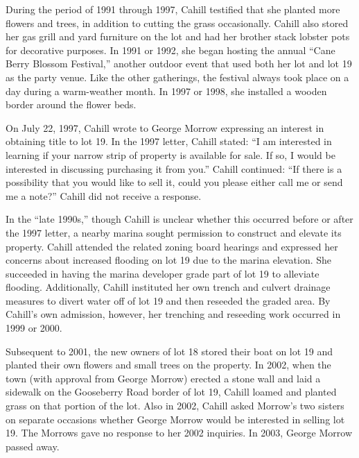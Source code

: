 During the period of 1991 through 1997, Cahill testified that she planted more
flowers and trees, in addition to cutting the grass occasionally. Cahill also
stored her gas grill and yard furniture on the lot and had her brother stack
lobster pots for decorative purposes. In 1991 or 1992, she began hosting the
annual ``Cane Berry Blossom Festival,'' another outdoor event that used both
her lot and lot 19 as the party venue. Like the other gatherings, the festival
always took place on a day during a warm-weather month. In 1997 or 1998, she
installed a wooden border around the flower beds.

On July 22, 1997, Cahill wrote to George Morrow expressing an interest in
obtaining title to lot 19. In the 1997 letter, Cahill stated: ``I am interested
in learning if your narrow strip of property is available for sale. If so, I
would be interested in discussing purchasing it from you.'' Cahill continued:
``If there is a possibility that you would like to sell it, could you please
either call me or send me a note?'' Cahill did not receive a response.

In the ``late 1990s,'' though Cahill is unclear whether this occurred before or
after the 1997 letter, a nearby marina sought permission to construct and
elevate its property. Cahill attended the related zoning board hearings and
expressed her concerns about increased flooding on lot 19 due to the marina
elevation. She succeeded in having the marina developer grade part of lot 19 to
alleviate flooding. Additionally, Cahill instituted her own trench and culvert
drainage measures to divert water off of lot 19 and then reseeded the graded
area. By Cahill's own admission, however, her trenching and reseeding work
occurred in 1999 or 2000.

Subsequent to 2001, the new owners of lot
18 stored their boat on lot
19 and planted their own flowers and small trees on the property. In 2002, when
the town (with approval from George Morrow) erected a stone wall and laid a
sidewalk on the Gooseberry Road border of lot 19, Cahill loamed and planted
grass on that portion of the lot. Also in 2002, Cahill asked Morrow's two
sisters on separate occasions whether George Morrow would be interested in
selling lot 19. The Morrows gave no response to her 2002 inquiries. In 2003,
George Morrow passed away.

